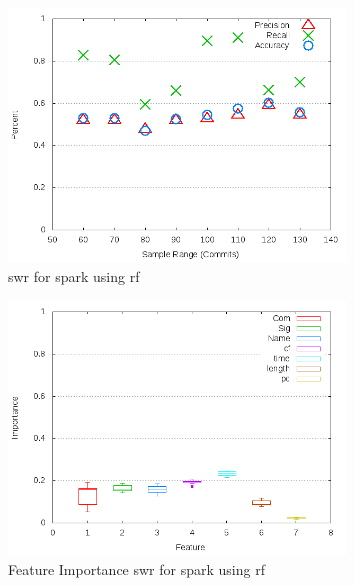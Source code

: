 \begin{figure}[!t]
\centering
\includegraphics[width=0.8\textwidth]{images/rf/test_1/spark_sample_range.png}
\caption{\gls{swr} for spark using \gls{rf}}
\label{fig:test_1_spark_rf}
\end{figure}

\begin{figure}[!t]
\centering
\includegraphics[width=0.8\textwidth]{images/rf/test_1/spark_importance.png}
\caption{Feature Importance \gls{swr} for spark using \gls{rf}}
\label{fig:test_1_spark_rf_importance}
\end{figure}

